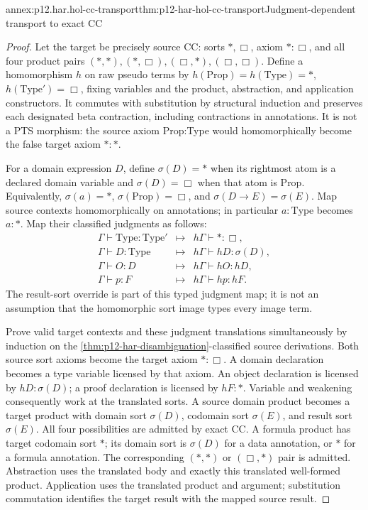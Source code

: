 \begin{annexitem}{annex:p12.har.hol-cc-transport}{thm:p12-har-hol-cc-transport}{Judgment-dependent transport to exact CC}
\begin{proof}
Let the target be precisely source CC:
sorts \(\ast,\Box\), axiom \(\ast:\Box\), and all four product
pairs \((\ast,\ast),(\ast,\Box),(\Box,\ast),(\Box,\Box)\).
Define a homomorphism \(h\) on raw pseudo terms by
\(h(\mathrm{Prop})=h(\mathrm{Type})=\ast\),
\(h(\mathrm{Type}')=\Box\), fixing variables and the product,
abstraction, and application constructors. It commutes with substitution
by structural induction and preserves each designated beta contraction,
including contractions in annotations. It is not a PTS morphism:
the source axiom Prop:Type would homomorphically become the false
target axiom \(\ast:\ast\).

For a domain expression \(D\), define \(\sigma(D)=\ast\) when its
rightmost atom is a declared domain variable and \(\sigma(D)=\Box\)
when that atom is Prop. Equivalently, \(\sigma(a)=\ast\),
\(\sigma(\mathrm{Prop})=\Box\), and
\(\sigma(D\to E)=\sigma(E)\).
Map source contexts homomorphically on annotations; in particular
\(a:\mathrm{Type}\) becomes \(a:\ast\). Map their classified
judgments as follows:
\[
\begin{array}{rcl}
 \Gamma\vdash\mathrm{Type}:\mathrm{Type}'
   &\mapsto& h\Gamma\vdash\ast:\Box,\\
 \Gamma\vdash D:\mathrm{Type}
   &\mapsto& h\Gamma\vdash hD:\sigma(D),\\
 \Gamma\vdash O:D
   &\mapsto& h\Gamma\vdash hO:hD,\\
 \Gamma\vdash p:F
   &\mapsto& h\Gamma\vdash hp:hF.
\end{array}
\]
The result-sort override is part of this typed judgment map; it is not
an assumption that the homomorphic sort image types every image term.

Prove valid target contexts and these judgment translations simultaneously
by induction on the \cref{thm:p12-har-disambiguation}-classified source derivations. Both source sort
axioms become the target axiom \(\ast:\Box\). A domain declaration
becomes a type variable licensed by that axiom. An object declaration
is licensed by \(hD:\sigma(D)\); a proof declaration is licensed
by \(hF:\ast\). Variable and weakening consequently work at the
translated sorts. A source domain product becomes a target product with
domain sort \(\sigma(D)\), codomain sort \(\sigma(E)\), and result
sort \(\sigma(E)\). All four possibilities are admitted by exact CC.
A formula product has target codomain sort \(\ast\); its domain
sort is \(\sigma(D)\) for a data annotation, or \(\ast\) for a
formula annotation. The corresponding \((\ast,\ast)\) or
\((\Box,\ast)\) pair is admitted. Abstraction uses the translated
body and exactly this translated well-formed product. Application uses
the translated product and argument; substitution commutation identifies
the target result with the mapped source result.


\end{proof}
\end{annexitem}
